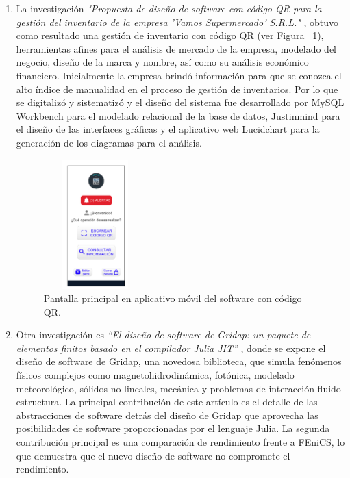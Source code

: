 \documentclass[10pt,conference]{IEEEtran}
\begin{document}
\begin{enumerate}
\item La investigación \textit{"Propuesta de diseño de software con código QR para la gestión del inventario de la empresa 'Vamos Supermercado' S.R.L."} \citep{albarracin2022diseno}, obtuvo como resultado una gestión de inventario con código QR (ver Figura ~\ref{fqr}), herramientas afines para el análisis de mercado de la empresa, modelado del negocio, diseño de la marca y nombre, así como su análisis económico financiero. Inicialmente la empresa brindó información para que se conozca el alto índice de manualidad en el proceso de gestión de inventarios. Por lo que se digitalizó y sistematizó y el diseño del sistema fue desarrollado por MySQL Workbench para el modelado relacional de la base de datos, Justinmind para el diseño de las interfaces gráficas y el aplicativo web Lucidchart para la generación de los diagramas para el análisis. 

\begin{figure}[H]
 \begin{center}
       \includegraphics[width=4cm, height=5cm]{figuras/qr.PNG}
      \caption{Pantalla principal en aplicativo móvil del software con código QR.}
      \label{fqr} 
      \end{center}
\end{figure}

\item Otra investigación es \textit{“El diseño de software de Gridap: un paquete de elementos finitos basado en el compilador Julia JIT”} \citep{VERDUGO2022108341}, donde se expone el diseño de software de Gridap, una novedosa biblioteca, que simula fenómenos físicos complejos como magnetohidrodinámica, fotónica, modelado meteorológico, sólidos no lineales, mecánica y problemas de interacción fluido-estructura. La principal contribución de este artículo es el detalle de las abstracciones de software detrás del diseño de Gridap que aprovecha las posibilidades de software proporcionadas por el lenguaje Julia. La segunda contribución principal es una comparación de rendimiento frente a FEniCS, lo que demuestra que el nuevo diseño de software no compromete el rendimiento.
\end{enumerate}
\end{document}
